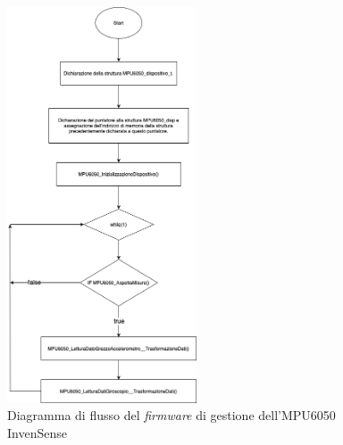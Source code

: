 \begin{figure}[H]
    \centering
    \includegraphics[width=0.5\textwidth,keepaspectratio]{figures copia/Diagramma_di_flusso_GestionMPU6050InvenSense.drawio.png}
    \caption{Diagramma di flusso del \textit{firmware} di gestione dell'MPU6050 InvenSense}
    \label{fig:diagramma 2.1}
\end{figure}

\newpage

